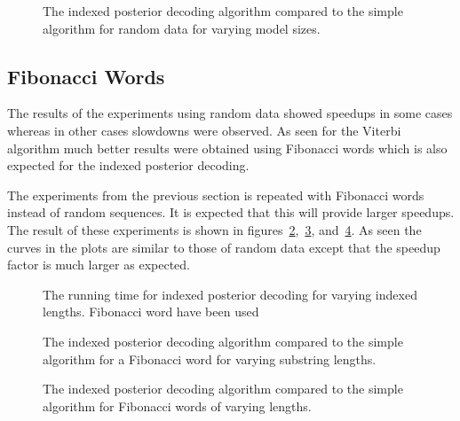 \begin{figure}
  \centering
  
  \caption{The indexed posterior decoding algorithm compared to the simple
    algorithm for random data for varying model sizes.}
  \label{fig:indexed_posterior_speedup_vs_N}
\end{figure}

\subsection{Fibonacci Words}

The results of the experiments using random data showed speedups in some cases
whereas in other cases slowdowns were observed. As seen for the Viterbi
algorithm much better results were obtained using Fibonacci words which
is also expected for the indexed posterior decoding.

The experiments from the previous section is repeated with Fibonacci words
instead of random sequences. It is expected that this will provide larger
speedups. The result of these experiments is shown in
figures~\ref{fig:assymptotic_indexed_posterior_fib_subseq_length.tex},~\ref{fig:fib_indexed_posterior_speedup_vs_subseq},
and~\ref{fig:indexed_posterior_fib_speedup_vs_T}. As seen the curves in the
plots are similar to those of random data except that the speedup factor is
much larger as expected.

\begin{figure}
  \centering
  
  \caption{The running time for indexed posterior decoding for
    varying indexed lengths. Fibonacci word have been used}
  \label{fig:assymptotic_indexed_posterior_fib_subseq_length.tex}
\end{figure}

\begin{figure}
  \centering
  
  \caption{The indexed posterior decoding algorithm compared to the simple
    algorithm for a Fibonacci word for varying substring lengths.}
  \label{fig:fib_indexed_posterior_speedup_vs_subseq}
\end{figure}

\begin{figure}
  \centering
  
  \caption{The indexed posterior decoding algorithm compared to the simple
    algorithm for Fibonacci words of varying lengths.}
  \label{fig:indexed_posterior_fib_speedup_vs_T}
\end{figure}


